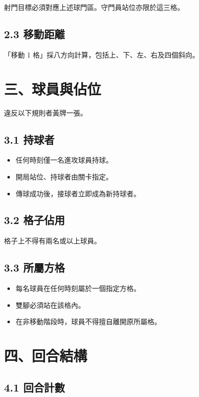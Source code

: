 \documentclass[11pt]{article}
\begin{document}
射門目標必須對應上述球門區。守門員站位亦限於這三格。

\subsection*{2.3 移動距離}

「移動 1 格」採八方向計算，包括上、下、左、右及四個斜向。

\section*{三、球員與佔位}

違反以下規則者黃牌一張。

\subsection*{3.1 持球者}

\begin{itemize}
  \item 任何時刻僅一名進攻球員持球。
  \item 開局站位、持球者由關卡指定。
  \item 傳球成功後，接球者立即成為新持球者。
\end{itemize}

\subsection*{3.2 格子佔用}

格子上不得有兩名或以上球員。

\subsection*{3.3 所屬方格}

\begin{itemize}
  \item 每名球員在任何時刻屬於一個指定方格。
  \item 雙腳必須站在該格內。
  \item 在非移動階段時，球員不得擅自離開原所屬格。
\end{itemize}

\section*{四、回合結構}

\subsection*{4.1 回合計數}
\end{document}
